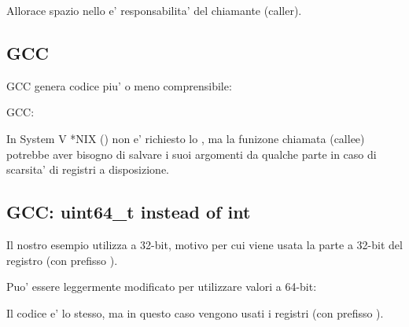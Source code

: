 Allorace spazio nello  e' responsabilita' del chiamante (\gls{caller}).

\subsection{GCC}

\Optimizing GCC genera codice piu' o meno comprensibile:



\NonOptimizing GCC:




In System V *NIX (\SysVABI) non e' richiesto lo , ma la funizone chiamata (\gls{callee}) potrebbe aver bisogno di salvare
i suoi argomenti da qualche parte in caso di scarsita' di registri a disposizione.

\subsection{GCC: uint64\_t instead of int}

Il nostro esempio utilizza \Tint a 32-bit, motivo per cui viene usata la parte a 32-bit del registro (con prefisso ).

Puo' essere leggermente modificato per utilizzare valori a 64-bit:





Il codice e' lo stesso, ma in questo caso vengono usati i registri  (con prefisso ).
